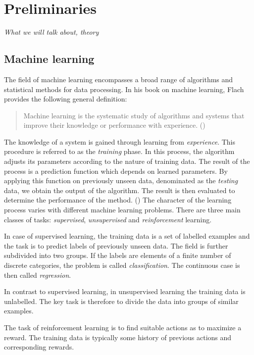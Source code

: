 \chapter{Preliminaries}

\textit{What we will talk about, theory}

\section{Machine learning}
The field of machine learning encompasses a broad range of algorithms and
statistical methods for data processing. In his book on machine learning,
Flach provides the following general definition:

\blockquote{Machine learning is the systematic study of algorithms and systems
that improve their knowledge or performance with experience.
(\cite{Flach:2012:MLA:2490546})} %
%
%
The knowledge of a system is gained through learning from \emph{experience}.
This procedure is referred to as the \emph{training} phase. In this process, 
the algorithm adjusts its parameters according to the nature of training data.
The result of the process is a prediction function which depends on learned
parameters. By applying this function on previously unseen data, denominated 
as the \emph{testing} data, we obtain the output of the algorithm. The 
result is then evaluated to determine the performance of the method. 
(\cite{Bishop:2006:PRM:1162264}) The character of the learning process
varies with different machine learning problems. There are three main classes 
of tasks: \emph{supervised}, \emph{unsupervised} and \emph{reinforcement} 
learning.

In case of supervised learning, the training data is a set of labelled examples
and the task is to predict labels of previously unseen data. The field is 
further subdivided into two groups. If the labels are elements of a finite 
number of discrete categories, the problem is called \emph{classification}. 
The continuous case is then called \emph{regression}.

In contrast to supervised learning, in unsupervised learning the training data 
is unlabelled. The key task is therefore to divide the data into groups of 
similar examples.

The task of reinforcement learning is to find suitable actions as to maximize 
a reward. The training data is typically some history of previous actions 
and corresponding rewards.

